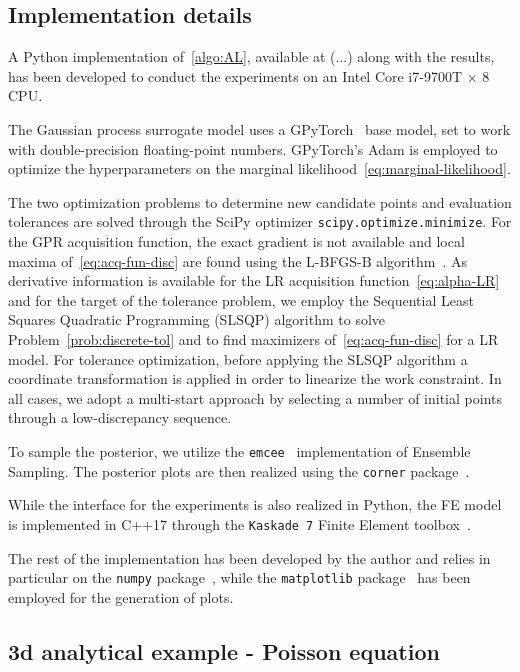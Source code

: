 \subsection{Implementation details}\label{sec:implementation}
A Python implementation of~\ref{algo:AL}, available at (...) along with the results, has been developed to conduct the experiments on an Intel Core i7-9700T × 8 CPU. \medskip

The Gaussian process surrogate model uses a GPyTorch~\cite{GPyTorchPaper} base model, set to work with double-precision floating-point numbers.
GPyTorch's Adam is employed to optimize the hyperparameters on the marginal likelihood~\eqref{eq:marginal-likelihood}. \medskip

The two optimization problems to determine new candidate points and evaluation tolerances are solved through the SciPy optimizer \texttt{scipy.optimize.minimize}. 
For the GPR acquisition function, the exact gradient is not available and local maxima of~\eqref{eq:acq-fun-disc} are found using the L-BFGS-B algorithm~\cite{ZhuBirdNocedal}. 
As derivative information is available for the LR acquisition function~\eqref{eq:alpha-LR} and for the target of the tolerance problem, we employ the Sequential Least Squares Quadratic Programming (SLSQP) algorithm to solve Problem~\eqref{prob:discrete-tol} and to find maximizers of~\eqref{eq:acq-fun-disc} for a LR model. 
For tolerance optimization, before applying the SLSQP algorithm a coordinate transformation is applied in order to linearize the work constraint. 
In all cases, we adopt a multi-start approach by selecting a number of initial points through a low-discrepancy sequence. \medskip

To sample the posterior, we utilize the \texttt{emcee}~\cite{emceePaper} implementation of Ensemble Sampling. The posterior plots are then realized using the \texttt{corner} package~\cite{corner}. \medskip

While the interface for the experiments is also realized in Python, the FE model is implemented in C++17 through the \texttt{Kaskade 7} Finite Element toolbox~\cite{GoetschelSchielaWeiser2021}.\medskip

The rest of the implementation has been developed by the author and relies in particular on the \texttt{numpy} package~\cite{numpy}, while the \texttt{matplotlib} package~\cite{matplotlib} has been employed for the generation of plots. 

\subsection{3d analytical example - Poisson equation}\label{sec:3dexp}

